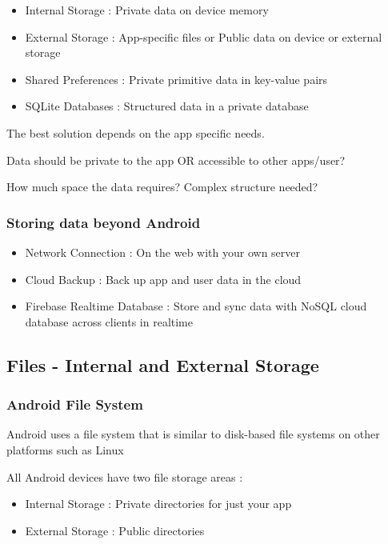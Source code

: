 \documentclass{article}
\begin{document}
  \begin{itemize}
      \item Internal Storage : Private data on device memory
      \item External Storage : App-specific files or Public data on device or external storage
      \item Shared Preferences : Private primitive data in key-value pairs
      \item SQLite Databases : Structured data in a private database
  \end{itemize}

  The best solution depends on the app specific needs.

  Data should be private to the app OR accessible to other apps/user?

  How much space the data requires?  Complex structure needed?

  \subsubsection{Storing data beyond Android}

  \begin{itemize}
      \item Network Connection : On the web with your own server
      \item Cloud Backup : Back up app and user data in the cloud
      \item Firebase Realtime Database : Store and sync data with NoSQL cloud database across clients in realtime
  \end{itemize}

  \subsection{Files - Internal and External Storage}

\subsubsection{Android File System}

Android uses a file system that is similar to disk-based file systems on other platforms such as Linux

All Android devices have two file storage areas :

\begin{itemize}
    \item Internal Storage : Private directories for just your app
    \item External Storage : Public directories
\end{itemize}
\end{document}
